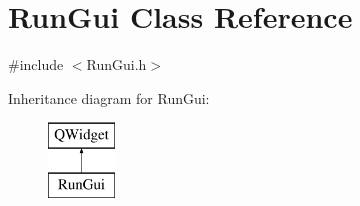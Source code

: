 \hypertarget{class_run_gui}{\section{Run\-Gui Class Reference}
\label{class_run_gui}
}


{\ttfamily \#include $<$Run\-Gui.\-h$>$}

Inheritance diagram for Run\-Gui\-:\begin{figure}[H]
\begin{center}
\leavevmode
\includegraphics[height=2.000000cm]{class_run_gui}
\end{center}
\end{figure}
